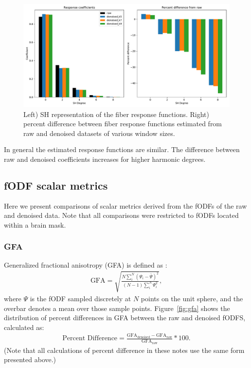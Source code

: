 \documentclass{article}
\begin{document}
\begin{figure}[h]
  \centering
  \includegraphics[width=0.8\linewidth]{../figs/response_SH}
  \captionsetup{width=0.8\linewidth}
  \caption{Left) SH representation of the fiber response functions. Right)
    percent difference between fiber response functions estimated from raw and
    denoised datasets of various window sizes.}
  \label{fig:response_sh}
\end{figure}

In general the estimated response functions are similar. The difference
between raw and denoised coefficients increases for higher harmonic degrees. 

\subsection{fODF scalar metrics}

Here we present comparisons of scalar metrics derived from the fODFs of the raw
and denoised data. Note that all comparisons were restricted to fODFs located
within a brain mask.

\subsubsection{GFA}
Generalized fractional anisotropy (GFA) is defined as \cite{Cohen-Adad2011}:
\begin{align}
  \text{GFA} = \sqrt{\frac{N \sum_i^N{(\Psi_i - \bar{\Psi})^2}}{(N-1) \sum_i^N{\Psi_i ^ 2}}},
\end{align}
where $\Psi$ is the fODF sampled discretely at $N$ points on the unit sphere,
and the overbar denotes a mean over those sample points. Figure~\ref{fig:gfa}
shows the distribution of percent differences in GFA between the raw and
denoised fODFS, calculated as:
\begin{align}
  \text{Percent Difference} = \frac{\text{GFA}_{\text{denoised}} - \text{GFA}_{\text{raw}}}{\text{GFA}_{\text{raw}}} * 100.
\end{align}
(Note that all calculations of percent difference in these notes use the same
form presented above.)
\end{document}
